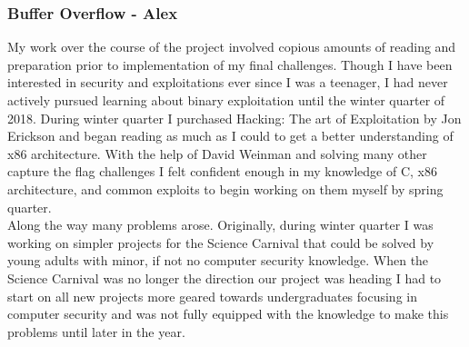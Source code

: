 \documentclass[runningheads,a4paper]{llncs}
\begin{document}
\subsubsection{Buffer Overflow - Alex}
My work over the course of the project involved copious amounts of reading and preparation prior to implementation of my final challenges. Though I have been interested in security and exploitations ever since I was a teenager, I had never actively pursued learning about binary exploitation until the winter quarter of 2018. During winter quarter I purchased Hacking: The art of Exploitation by Jon Erickson and began reading as much as I could to get a better understanding of x86 architecture. With the help of David Weinman and solving many other capture the flag challenges I felt confident enough in my knowledge of C, x86 architecture, and common exploits to begin working on them myself by spring quarter.\\
Along the way many problems arose. Originally, during winter quarter I was working on simpler projects for the Science Carnival that could be solved by young adults with minor, if not no computer security knowledge. When the Science Carnival was no longer the direction our project was heading I had to start on all new projects more geared towards undergraduates focusing in computer security and was not fully equipped with the knowledge to make this problems until later in the year.
\end{document}
